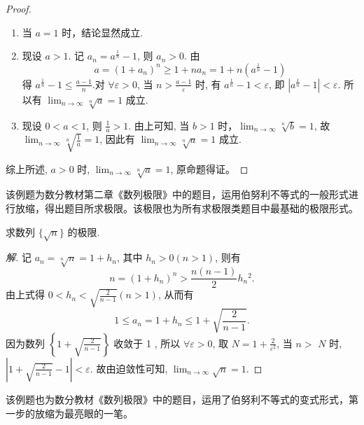 \begin{proof}
  \begin{enumerate}
    \item 当 $a=1$ 时，结论显然成立.
    \item 现设 $a>1$. 记 $a_{n}=a^{\frac{1}{n}}-1$, 则 $a_{n}>0$. 由
      \[
        a=\left(1+a_{n}\right)^{n} \geq 1+n a_{n}=1+n\left(a^{\frac{1}{n}}-1\right)
      \]
      得 $a^{\frac{1}{n}}-1 \leq \frac{a-1}{n}$.对 $\forall \varepsilon>0$, 当 $n>\frac{a-1}{\varepsilon}$ 时, 有 $a^{\frac{1}{n}}-1<\varepsilon$, 即 $\left|a^{\frac{1}{n}}-1\right|<\varepsilon$. 所以有 $\lim _{n \rightarrow \infty} \sqrt[n]{a}=1$ 成立.
      \item 现设 $0<a<1$, 则 $\frac{1}{a}>1$. 由上可知, 当 $b>1$ 时，$\lim _{n \rightarrow \infty} \sqrt[n]{b}=1$, 故 $\lim _{n \rightarrow \infty} \sqrt[n]{\frac{1}{a}}=1$, 因此有 $\lim _{n \rightarrow \infty} \sqrt[n]{a}=1$ 成立.
  \end{enumerate}

  综上所述, $a>0$ 时, $\lim _{n \rightarrow \infty} \sqrt[n]{a}=1$, 原命题得证。
\end{proof}


\begin{analysis}
  该例题为数分教材第二章《数列极限》中的题目，运用伯努利不等式的一般形式进行放缩，得出题目所求极限。该极限也为所有求极限类题目中最基础的极限形式。
\end{analysis}


\begin{example}
  \parencite{华东师大数学分析} 求数列 $\{\sqrt{n}\}$ 的极限.
\end{example}

\begin{proof}[解]
  记 $a_{n}=\sqrt[n]{n}=1+h_{n}$, 其中 $h_{n}>0(n>1)$, 则有
  \[n=\left(1+h_{n}\right)^{n}>\frac{n(n-1)}{2} h_{n}{ }^{2}.\]
  由上式得 $0<h_{n}<\sqrt{\frac{2}{n-1}}(n>1)$, 从而有
  \[
    1 \leq a_{n}=1+h_{n} \leq 1+\sqrt{\frac{2}{n-1}}.
  \]
  因为数列 $\left\{1+\sqrt{\frac{2}{n-1}}\right\}$ 收敛于 1 , 所以 $\forall \varepsilon>0$, 取 $N=1+\frac{2}{\varepsilon^{2}}$, 当 $n>$ $N$ 时, $\left|1+\sqrt{\frac{2}{n-1}}-1\right|<\varepsilon$. 故由迫敛性可知, $\lim _{n \rightarrow \infty} \sqrt{n}=1$.
\end{proof}

\begin{analysis}
  该例题也为数分教材《数列极限》中的题目，运用了伯努利不等式的变式形式，第一步的放缩为最亮眼的一笔。
\end{analysis}